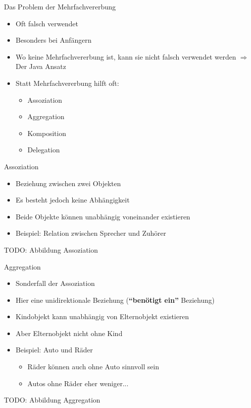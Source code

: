 \begin{frame}{Das Problem der Mehrfachvererbung}
    \begin{itemize}
        \item Oft falsch verwendet
        \item Besonders bei Anfängern
        \item Wo keine Mehrfachvererbung ist, kann sie nicht falsch verwendet werden $\Rightarrow$ Der Java Ansatz
        \item Statt Mehrfachvererbung hilft oft:
        \begin{itemize}
            \item Assoziation
            \item Aggregation
            \item Komposition
            \item Delegation
        \end{itemize}
    \end{itemize}
\end{frame}

\begin{frame}{Assoziation}
\begin{itemize}
    \item Beziehung zwischen zwei Objekten
    \item Es besteht jedoch keine Abhängigkeit
    \item Beide Objekte können unabhängig voneinander existieren
    \item Beispiel: Relation zwischen Sprecher und Zuhörer
\end{itemize}
TODO: Abbildung Assoziation
\end{frame}

\begin{frame}{Aggregation}
\begin{itemize}
    \item Sonderfall der Assoziation
    \item Hier eine unidirektionale Beziehung (\textbf{"`benötigt ein"'} Beziehung)
    \item Kindobjekt kann unabhängig von Elternobjekt existieren
    \item Aber Elternobjekt nicht ohne Kind
    \item Beispiel: Auto und Räder
    \begin{itemize}
        \item Räder können auch ohne Auto sinnvoll sein
        \item Autos ohne Räder eher weniger...
    \end{itemize}
\end{itemize}
TODO: Abbildung Aggregation
\end{frame}

